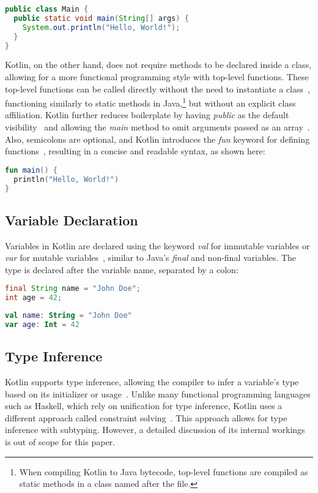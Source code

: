 \documentclass[a4paper,11pt]{article}
\begin{document}
\begin{lstlisting}[language=Java, title={Java main method}]
public class Main {
  public static void main(String[] args) {
    System.out.println("Hello, World!");
  }
}
\end{lstlisting}

Kotlin, on the other hand, does not require methods to be declared inside a class, allowing for a more functional programming style with top-level functions. These top-level functions can be called directly without the need to instantiate a class~\cite{kotlin-functions-scope}, functioning similarly to static methods in Java,\footnote{When compiling Kotlin to Java bytecode, top-level functions are compiled as static methods in a class named after the file.} but without an explicit class affiliation. Kotlin further reduces boilerplate by having \textit{public} as the default visibility~\cite{visibility-modifiers} and allowing the \textit{main} method to omit arguments passed as an array~\cite{program-entry-point}. Also, semicolons are optional, and Kotlin introduces the \textit{fun} keyword for defining functions~\cite{functions}, resulting in a concise and readable syntax, as shown here:

\begin{lstlisting}[language=Kotlin, title={Kotlin main method}]
fun main() {
  println("Hello, World!")
}
\end{lstlisting}

\subsection{Variable Declaration}\label{sec:variables}
Variables in Kotlin are declared using the keyword \textit{val} for immutable variables or \textit{var} for mutable variables~\cite{variables}, similar to Java's \textit{final} and non-final variables. The type is declared after the variable name, separated by a colon:

\begin{lstlisting}[language=Java, title={Java data types}]
final String name = "John Doe";
int age = 42;
\end{lstlisting}

\begin{lstlisting}[language=Kotlin, title={Kotlin data types}]
val name: String = "John Doe"
var age: Int = 42
\end{lstlisting}

\subsection{Type Inference}
Kotlin supports type inference, allowing the compiler to infer a variable's type based on its initializer or usage~\cite{type-inference}.
Unlike many functional programming languages such as Haskell, which rely on unification for type inference, Kotlin uses a different approach called constraint solving~\cite{type-constraints}.
This approach allows for type inference with subtyping.
However, a detailed discussion of its internal workings is out of scope for this paper.
\end{document}
